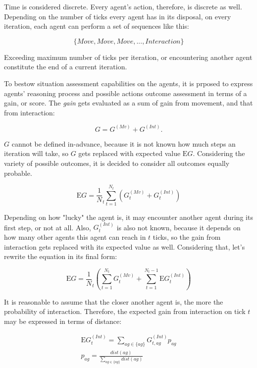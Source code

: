 Time is considered discrete. Every agent's action, therefore, is discrete as well. Depending on the number of ticks every agent has in its disposal, on every iteration, each agent can perform a set of sequences like this:

$$
    \{Move, Move, Move, ..., Interaction\}
$$

Exceeding maximum number of ticks per iteration, or encountering another agent constitute the end of a current iteration.

To bestow situation assessment capabilities on the agents, it is prposed to express agents' reasoning process and possible actions outcome assessment in terms of a gain, or score. The \textit{gain} gets evaluated as a sum of gain from movement, and that from interaction:

$$
G = G^{(Mv)} + G^{(Int)}.
$$

$G$ cannot be defined in-advance, because it is not known how much steps an iteration will take, so $G$ gets replaced with expected value $\mathrm{E}G$. Considering the variety of possible outcomes, it is decided to consider all outcomes equally probable.

$$
    \mathrm{E}G = \frac 1 N_t \sum_{t=1}^{N_t}{(G^{(Mv)}_t + G^{(Int)}_t)}
$$

Depending on how "lucky" the agent is, it may encounter another agent during its first step, or not at all. Also, $G^{(Int)}_t$ is also not known, because it depends on how many other agents this agent can reach in $t$ ticks, so the gain from interaction gets replaced with its expected value as well. Considering that, let's rewrite the equation in its final form:

\begin{equation}
    \mathrm{E}{G} = \frac 1 N_t (\sum_{t=1}^{N_t}{G^{(Mv)}_t} + \sum_{t=1}^{N_t - 1}{\mathrm{E}G^{(Int)}_t})
\end{equation}

It is reasonable to assume that the closer another agent is, the more the probability of interaction. Therefore, the expected gain from interaction on tick $t$ may be expressed in terms of distance:

\begin{equation}
    \begin{gathered}
        \mathrm{E}G^{(Int)}_t = \sum_{ag \in \{ag\}}{G^{(Int)}_{t,ag}p_{ag}}\\
        p_{ag} = \frac {dist(ag)} {\sum_{ag \in \{ag\}}{dist(ag)}}
    \end{gathered}
\end{equation}
